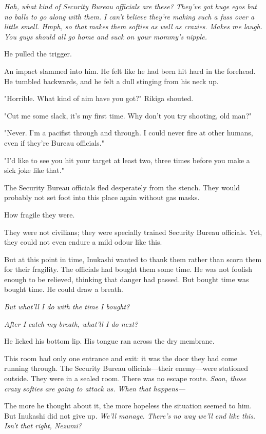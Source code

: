 \emph{Hah, what kind of Security Bureau officials are these? They've got huge
egos but no balls to go along with them. I can't believe they're making
such a fuss over a little smell. Hmph, so that makes them softies as
well as crazies. Makes me laugh. You guys should all go home and suck on
your mommy's nipple.}

He pulled the trigger.

An impact slammed into him. He felt like he had been hit hard in the
forehead. He tumbled backwards, and he felt a dull stinging from his
neck up.

"Horrible. What kind of aim have you got?" Rikiga shouted.

"Cut me some slack, it's my first time. Why don't you try shooting, old
man?"

"Never. I'm a pacifist through and through. I could never fire at other
humans, even if they're Bureau officials."

"I'd like to see you hit your target at least two, three times before
you make a sick joke like that."

The Security Bureau officials fled desperately from the stench. They
would probably not set foot into this place again without gas masks.

How fragile they were.

They were not civilians; they were specially trained Security Bureau
officials. Yet, they could not even endure a mild odour like this.

But at this point in time, Inukashi wanted to thank them rather than
scorn them for their fragility. The officials had bought them some time.
He was not foolish enough to be relieved, thinking that danger had
passed. But bought time was bought time. He could draw a breath.

\emph{But what'll I do with the time I bought?}

\emph{After I catch my breath, what'll I do next?}

He licked his bottom lip. His tongue ran across the dry membrane.

This room had only one entrance and exit: it was the door they had come
running through. The Security Bureau officials---their enemy---were
stationed outside. They were in a sealed room. There was no escape
route. \emph{Soon, those crazy softies are going to attack us. When that
happens---}

The more he thought about it, the more hopeless the situation seemed to
him. But Inukashi did not give up. \emph{We'll manage. There's no way we'll
end like this. Isn't that right, Nezumi?}

